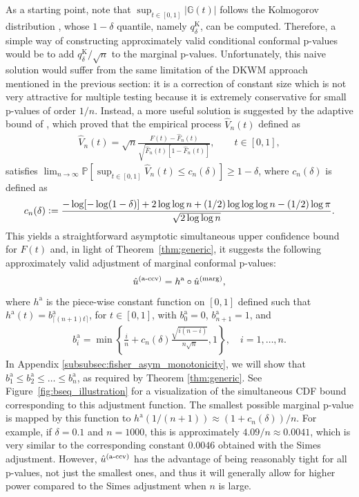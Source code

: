 \documentclass[11pt]{article}
\newcommand{\defeq}{\vcentcolon=}
\def\marg{\textnormal{(marg)}}
\renewcommand{\P}{\mathbb{P}}
\begin{document}
As a starting point, note that $\sup_{t \in [0,1]}|\mathbb{G}(t)|$ follows the Kolmogorov distribution \cite{kolmogorov1933sulla}, whose $1-\delta$ quantile, namely $q^{\text{K}}_{\delta}$, can be computed. Therefore, a simple way of constructing approximately valid conditional conformal p-values would be to add $q^{\text{K}}_{\delta} / \sqrt{n}$ to the marginal p-values. Unfortunately, this naive solution would suffer from the same limitation of the DKWM approach mentioned in the previous section: it is a correction of constant size which is not very attractive for multiple testing because it is extremely conservative for small p-values of order $1/n$.
Instead, a more useful solution is suggested by the adaptive bound of \cite{eicker1979asymptotic}, which proved that the empirical process $\hat{V}_n(t)$ defined as
\begin{align*}
\hat{V}_n(t) = \sqrt{n} \frac{F(t) - \hat{F}_n(t)}{ \sqrt{\hat{F}_n(t)[1 - \hat{F}_n(t)]}}, \qquad t \in [0,1],
\end{align*}
satisfies $\lim_{n \to \infty} \P[ \sup_{t \in [0, 1]}\hat{V}_n(t) \leq c_n(\delta) ] \geq 1-\delta$,
where $c_n(\delta)$ is defined as
\begin{align*}
c_n(\delta) \defeq \frac{-\log[-\log(1-\delta)]+2\log\log n + (1/2) \log \log \log n - (1/2) \log\pi }{\sqrt{2 \log \log n}}.
\end{align*}
This yields a straightforward asymptotic simultaneous upper confidence bound for $F(t)$ and, in light of Theorem~\ref{thm:generic}, it suggests the following approximately valid adjustment of marginal conformal p-values: 
\begin{align} \label{eq:a-ccv}
\hat{u}^{\textnormal{(a-ccv)}} = h^{\mathrm{a}}\circ \hat{u}^\marg,
\end{align}
where $h^{\mathrm{a}}$ is the piece-wise constant function on $[0,1]$ defined such that $h^{\mathrm{a}}(t) = b^{\mathrm{a}}_{\lceil (n + 1)t\rceil}$, for $t\in [0, 1]$, with $b^{\mathrm{a}}_0=0$, $b^{\mathrm{a}}_{n+1}=1$, and 
\begin{align} \label{eq:a-sequence}
b^{\mathrm{a}}_i = \min\left\{\frac{i}{n} + c_n(\delta) \frac{\sqrt{i(n-i)}}{n \sqrt{n}}, 1\right\},
\quad i = 1,\ldots,n.
\end{align}
In Appendix \ref{subsubsec:fisher_asym_monotonicity}, we will show that $b_1^{\mathrm{a}} \le b_2^{\mathrm{a}}\le \ldots \le b_n^{\mathrm{a}}$, as required by Theorem \ref{thm:generic}. See Figure~\ref{fig:bseq_illustration} for a visualization of the simultaneous CDF bound corresponding to this adjustment function.
The smallest possible marginal p-value is mapped by this function to $h^{\mathrm{a}}(1 / (n + 1)) \approx (1+c_n(\delta))/n$. For example, if $\delta = 0.1$ and $n=1000$, this is approximately $4.09/n \approx 0.0041$, which is very similar to the corresponding constant $0.0046$ obtained with the Simes adjustment.
However, $\hat{u}^{\textnormal{(a-ccv)}}$ has the advantage of being reasonably tight for all p-values, not just the smallest ones, and thus it will generally allow for higher power compared to the Simes adjustment when $n$ is large.
\end{document}
